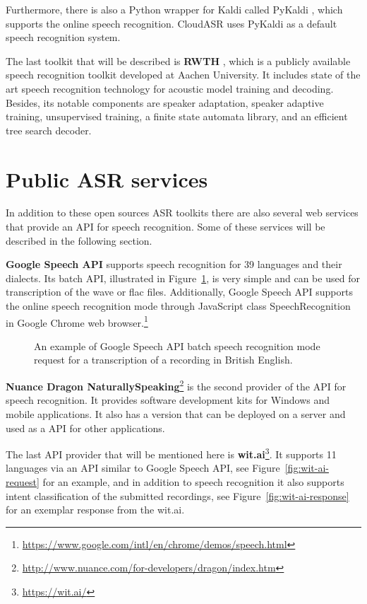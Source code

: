 Furthermore, there is also a Python wrapper for Kaldi called PyKaldi \cite{platek2014free},
  which supports the online speech recognition.
CloudASR uses PyKaldi as a default speech recognition system.

The last toolkit that will be described is \textbf{RWTH} \cite{rybach2009rwth},
  which is a publicly available speech recognition toolkit developed at Aachen University.
It includes state of the art speech recognition technology for acoustic model training and decoding.
Besides, its notable components are speaker adaptation,
  speaker adaptive training,
  unsupervised training,
  a finite state automata library,
  and an efficient tree search decoder.


\section{Public ASR services}
In addition to these open sources ASR toolkits
  there are also several web services that provide an API for speech recognition.
Some of these services will be described in the following section.

\textbf{Google Speech API} supports speech recognition for 39 languages and their dialects.
Its batch API, illustrated in Figure~\ref{fig:google-api}, is very simple and can be used for transcription of the wave or flac files.
Additionally,
  Google Speech API supports the online speech recognition mode through JavaScript class SpeechRecognition in Google Chrome web browser.\footnote{\url{https://www.google.com/intl/en/chrome/demos/speech.html}}

\begin{figure}[h]
  

  \caption{An example of Google Speech API batch speech recognition mode request for a transcription of a recording in British English.}
  \label{fig:google-api}
\end{figure}


\textbf{Nuance Dragon NaturallySpeaking}\footnote{\url{http://www.nuance.com/for-developers/dragon/index.htm}}
  is the second provider of the API for speech recognition.
It provides software development kits for Windows and mobile applications.
It also has a version that can be deployed on a server and used as a API for other applications.


The last API provider that will be mentioned here is \textbf{wit.ai}\footnote{\url{https://wit.ai/}}.
It supports 11 languages via an API similar to Google Speech API, see Figure~\ref{fig:wit-ai-request} for an example,
  and in addition to speech recognition it also supports intent classification of the submitted recordings,
  see Figure~\ref{fig:wit-ai-response} for an exemplar response from the wit.ai.

